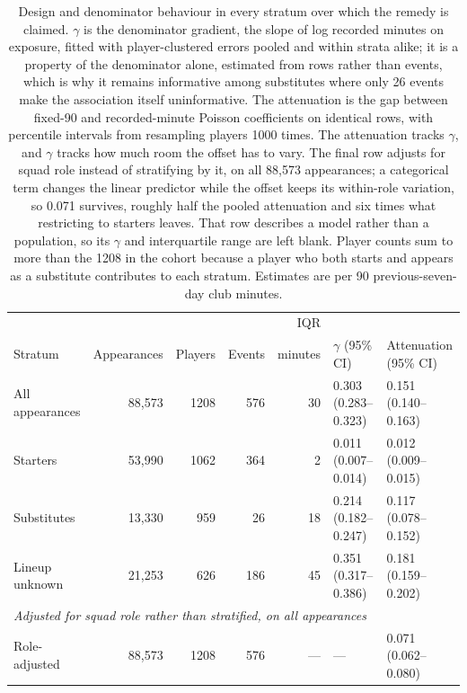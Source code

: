 \documentclass[11pt]{article}
\begin{document}
\clearpage

\begin{table}[htbp]
\centering
\caption{Design and denominator behaviour in every stratum over which the remedy is claimed. $\gamma$ is the denominator gradient, the slope of log recorded minutes on exposure, fitted with player-clustered errors pooled and within strata alike; it is a property of the denominator alone, estimated from rows rather than events, which is why it remains informative among substitutes where only 26 events make the association itself uninformative. The attenuation is the gap between fixed-90 and recorded-minute Poisson coefficients on identical rows, with percentile intervals from resampling players 1000 times. The attenuation tracks $\gamma$, and $\gamma$ tracks how much room the offset has to vary. The final row adjusts for squad role instead of stratifying by it, on all 88,573 appearances; a categorical term changes the linear predictor while the offset keeps its within-role variation, so 0.071 survives, roughly half the pooled attenuation and six times what restricting to starters leaves. That row describes a model rather than a population, so its $\gamma$ and interquartile range are left blank. Player counts sum to more than the 1208 in the cohort because a player who both starts and appears as a substitute contributes to each stratum. Estimates are per 90 previous-seven-day club minutes.}
\label{tab:strata}
\small
\setlength{\tabcolsep}{4pt}
\begin{tabular}{lrrrrll}
\toprule
 & & & & IQR & & \\
Stratum & Appearances & Players & Events & minutes & $\gamma$ (95\% CI) & Attenuation (95\% CI)\\
\midrule
All appearances & 88,573 & 1208 & 576 & 30 & 0.303 (0.283--0.323) & 0.151 (0.140--0.163)\\
Starters & 53,990 & 1062 & 364 & 2 & 0.011 (0.007--0.014) & 0.012 (0.009--0.015)\\
Substitutes & 13,330 & 959 & 26 & 18 & 0.214 (0.182--0.247) & 0.117 (0.078--0.152)\\
Lineup unknown & 21,253 & 626 & 186 & 45 & 0.351 (0.317--0.386) & 0.181 (0.159--0.202)\\
\midrule
\multicolumn{7}{l}{\emph{Adjusted for squad role rather than stratified, on all appearances}}\\
Role-adjusted & 88,573 & 1208 & 576 & --- & --- & 0.071 (0.062--0.080)\\
\bottomrule
\end{tabular}
\end{table}
\end{document}
